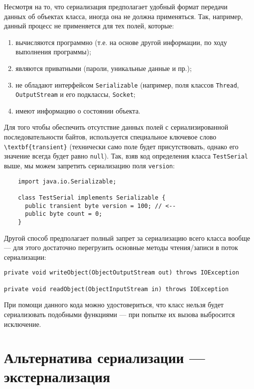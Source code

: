 Несмотря на то, что сериализация предполагает удобный формат передачи данных об объектах класса, иногда она не должна применяться. Так, например, данный процесс не применяется для тех полей, которые:

\begin{enumerate}
    \item вычисляются программно (т.е. на основе другой информации, по ходу выполнения программы);
    \item являются приватными (пароли, уникальные данные и пр.);
    \item не обладают интерфейсом \verb|Serializable| (например, поля классов \verb|Thread|, \verb|OutputStream| и его подклассы, \verb|Socket|;
    \item имеют информацию о состоянии объекта.
\end{enumerate}

Для того чтобы обеспечить отсутствие данных полей с сериализированной последовательности байтов, используется специальное ключевое слово \verb|\textbf{transient}| (технически само поле будет присутствовать, однако его значение всегда будет равно \verb|null|). Так, взяв код определения класса \verb|TestSerial| выше, мы можем запретить сериализацию поля \verb|version|:

\begin{lstlisting}
    import java.io.Serializable;
    
    class TestSerial implements Serializable {
      public transient byte version = 100; // <--
      public byte count = 0;
    }
\end{lstlisting}

Другой способ предполагает полный запрет за сериализацию всего класса вообще — для этого достаточно перегрузить основные методы чтения/записи в поток сериализации:

\begin{lstlisting}
private void writeObject(ObjectOutputStream out) throws IOException

private void readObject(ObjectInputStream in) throws IOException
\end{lstlisting}

При помощи данного кода можно удостовериться, что класс нельзя будет сериализовать подобными функциями — при попытке их вызова выбросится исключение.

\section{Альтернатива сериализации — экстернализация}

